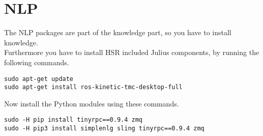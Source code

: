 \documentclass[main.tex]{subfiles}
\begin{document}
\section{NLP}
The NLP packages are part of the knowledge part, so you have to install knowledge.\\
Furthermore you have to install HSR included Julius components, by running the following commands.
\begin{lstlisting}
sudo apt-get update
sudo apt-get install ros-kinetic-tmc-desktop-full \end{lstlisting}
Now install the Python modules using these commands.
\begin{lstlisting}
sudo -H pip install tinyrpc==0.9.4 zmq
sudo -H pip3 install simplenlg sling tinyrpc==0.9.4 zmq \end{lstlisting}
	
\end{document}
